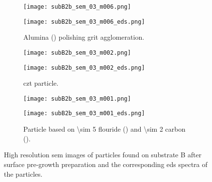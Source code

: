 \begin{figure}
    \centering
    \begin{subfigure}[t]{\textwidth}
          \begin{minipage}[t]{0.49\linewidth}
            \centering
            \texttt{[image: subB2b\_sem\_03\_m006.png]}
          \end{minipage}
          \hfill
          \begin{minipage}[t]{0.49\linewidth}
            \centering
            \texttt{[image: subB2b\_sem\_03\_m006\_eds.png]}
          \end{minipage}
        \caption{Alumina () polishing grit agglomeration.}\label{fig:subB2b_alumina}
    \end{subfigure}
    \par\bigskip
    \begin{subfigure}[t]{\textwidth}
          \begin{minipage}[t]{0.49\linewidth}
            \centering
            \texttt{[image: subB2b\_sem\_03\_m002.png]}
          \end{minipage}
          \hfill
          \begin{minipage}[t]{0.49\linewidth}
            \centering
            \texttt{[image: subB2b\_sem\_03\_m002\_eds.png]}
          \end{minipage}
        \caption{\Ac{czt} particle.}\label{fig:subB2b_czt}
    \end{subfigure}
    \par\bigskip
    \begin{subfigure}[t]{\textwidth}
          \begin{minipage}[t]{0.49\linewidth}
            \centering
            \texttt{[image: subB2b\_sem\_03\_m001.png]}
          \end{minipage}
          \hfill
          \begin{minipage}[t]{0.49\linewidth}
            \centering
            \texttt{[image: subB2b\_sem\_03\_m001\_eds.png]}
          \end{minipage}
        \caption{Particle based on \SI{\sim 5}{} flouride () and \SI{\sim 2}{} carbon ().}\label{fig:subB2b_C2F5}
    \end{subfigure}
    \caption[\Ac{sem} images and \ac{eds} spectra of particles found on substrate B after surface pre-growth preparation.]{High resolution \acf{sem} images of particles found on substrate B after surface pre-growth preparation and the corresponding \acf{eds} spectra of the particles.}\label{fig:subBb_sem_w_eds}
\end{figure}

